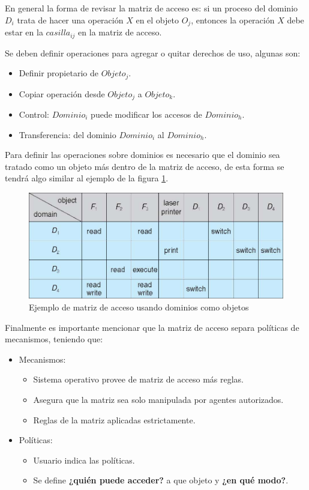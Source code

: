 En general la forma de revisar la matriz de acceso es: si un proceso del dominio
$D_i$ trata de hacer una operación $X$ en el objeto $O_j$, entonces la operación
$X$ debe estar en la $casilla_{ij}$ en la matriz de acceso.

Se deben definir operaciones para agregar o quitar derechos de uso, algunas son:
\begin{itemize}
\item Definir propietario de $Objeto_j$.
\item Copiar operación desde $Objeto_j$ a $Objeto_k$.
\item Control: $Dominio_i$ puede modificar los accesos de $Dominio_h$.
\item Transferencia: del dominio $Dominio_i$ al $Dominio_h$.
\end{itemize}

Para definir las operaciones sobre dominios es necesario que el dominio sea
tratado como un objeto más dentro de la matriz de acceso, de esta forma se
tendrá algo similar al ejemplo de la figura \ref{fig:matriz_acceso_dominios}.

\begin{figure}[htbp]
\centering
\includegraphics[scale=1.2]{img/C09_proteccion/matriz_acceso_dominios.jpg}
\caption{Ejemplo de matriz de acceso usando dominios como objetos}
\label{fig:matriz_acceso_dominios}
\end{figure}

Finalmente es importante mencionar que la matriz de acceso separa políticas de
mecanismos, teniendo que:
\begin{itemize}
\item Mecanismos:
\begin{itemize}
	\item Sistema operativo provee de matriz de acceso más reglas.
	\item Asegura que la matriz sea solo manipulada por agentes autorizados.
	\item Reglas de la matriz aplicadas estrictamente.
\end{itemize}
\item Políticas:
\begin{itemize}
	\item Usuario indica las políticas.
	\item Se define \textbf{¿quién puede acceder?} a que objeto y
	\textbf{¿en qué	modo?}.
\end{itemize}
\end{itemize}

